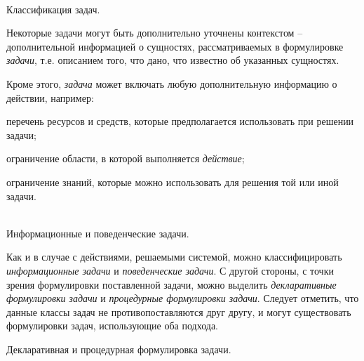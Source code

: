 \begin{frame}{\\Классификация задач.}
    \topline
	\justifying
 
    \vspace{0.33cm}
    
    Некоторые задачи могут быть дополнительно уточнены контекстом -- дополнительной информацией о сущностях, рассматриваемых в формулировке \textit{задачи}, т.е. описанием того, что дано, что известно об указанных сущностях.\\
    \vspace{0.33cm}
    
    Кроме этого, \textit{задача} может включать любую дополнительную информацию о действии, например:
    \begin{textitemize}
        \item перечень ресурсов и средств, которые предполагается использовать при решении задачи;
        \item ограничение области, в которой выполняется \textit{действие};
        \item ограничение знаний, которые можно использовать для решения той или иной задачи.
    \end{textitemize}
\end{frame}

\begin{frame}{\\Информационные и поведенческие задачи.}
	\topline
	\justifying

    Как и в случае с действиями, решаемыми системой, можно классифицировать \textit{информационные задачи} и \textit{поведенческие задачи}. 
    С другой стороны, с точки зрения формулировки поставленной задачи, можно выделить \textit{декларативные формулировки задачи} и \textit{процедурные формулировки задачи}. Следует отметить, что данные классы задач не противопоставляются друг другу, и могут существовать формулировки задач, использующие оба подхода.
\end{frame}

\begin{frame}{Декларативная и процедурная формулировка задачи.}
	\topline
	\justifying
     
    \begin{SCn}
    \end{SCn}
\end{frame}

